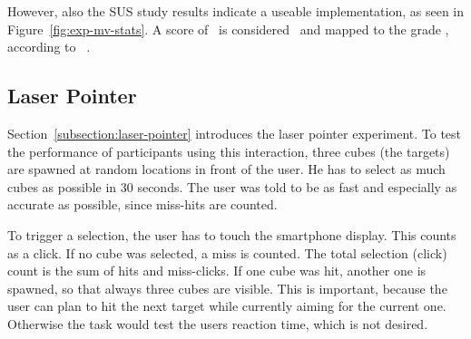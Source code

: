 However, also the \ac{SUS} study results indicate a useable implementation, as seen in Figure~\ref{fig:exp-mv-stats}. A score of \evalExpMvSusScore\ is considered \evalExpMvSusAdj\ and mapped to the grade \evalExpMvSusGrade, according to \citeauthor{Bangor.2009}~\cite{Bangor.2009}.



\subsection{Laser Pointer}\label{section:eval-res-lp}

Section~\ref{subsection:laser-pointer} introduces the laser pointer experiment. To test the performance of participants using this interaction, three cubes (the targets) are spawned at random locations in front of the user. He has to select as much cubes as possible in 30 seconds. The user was told to be as fast and especially as accurate as possible, since miss-hits are counted. 

To trigger a selection, the user has to touch the smartphone display. This counts as a click. If no cube was selected, a miss is counted. The total selection (click) count is the sum of hits and miss-clicks. If one cube was hit, another one is spawned, so that always three cubes are visible. This is important, because the user can plan to hit the next target while currently aiming for the current one. Otherwise the task would test the users reaction time, which is not desired. 

